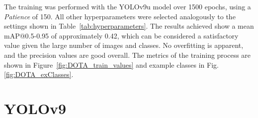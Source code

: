 The training was performed with the \acrshort{YOLO}v9u model over 1500 epochs, using a \textit{Patience} of 150. All other hyperparameters were selected analogously to the settings shown in Table~\ref{tab:hyperparameters}. The results achieved show a mean \acrshort{mAP}@0.5-0.95 of approximately 0.42, which can be considered a satisfactory value given the large number of images and classes. No overfitting is apparent, and the precision values are good overall. The metrics of the training process are shown in Figure~\ref{fig:DOTA_train_values} and example classes in Fig. \ref{fig:DOTA_exClasses}.





\section{YOLOv9}
\label{sec:yolov9}


